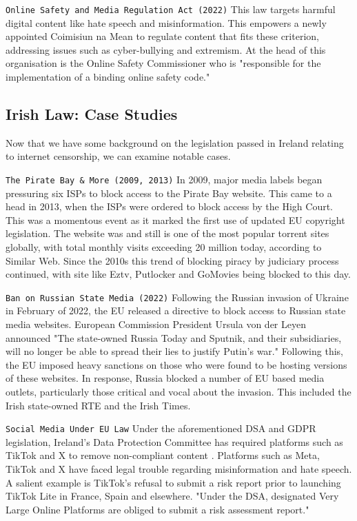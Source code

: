 \texttt{Online Safety and Media Regulation Act (2022)}
This law targets harmful digital content like hate speech and misinformation. This empowers a newly appointed Coimisiun na Mean to regulate content that fits these criterion, addressing issues such as cyber-bullying and extremism. At the head of this organisation is the Online Safety Commissioner who is "responsible for the implementation of a binding online safety code." \cite{onlinesafety2022}

\subsection{Irish Law: Case Studies}
Now that we have some background on the legislation passed in Ireland relating to internet censorship, we can examine notable cases. 

\texttt{The Pirate Bay \& More (2009, 2013)}
In 2009, major media labels began pressuring six ISPs to block access to the Pirate Bay website. This came to a head in 2013, when the ISPs were ordered to block access by the High Court. \cite{piratebay_block2013} This was a momentous event as it marked the first use of updated EU copyright legislation. The website was and still is one of the most popular torrent sites globally, with total monthly visits exceeding 20 million today, according to Similar Web. \cite{piratebay_stats2025} Since the 2010s this trend of blocking piracy by judiciary process continued, with site like Eztv, Putlocker and GoMovies being blocked to this day.

\texttt{Ban on Russian State Media (2022)}
Following the Russian invasion of Ukraine in February of 2022, the EU released a directive \cite{eu_sanctions_russia_media} to block access to Russian state media websites. European Commission President Ursula von der Leyen announced "The state-owned Russia Today and Sputnik, and their subsidiaries, will no longer be able to spread their lies to justify Putin’s war." \cite{rt_ban2022} Following this, the EU imposed heavy sanctions on those who were found to be hosting versions of these websites. In response, Russia blocked a number of EU based media outlets, particularly those critical and vocal about the invasion. This included the Irish state-owned RTE and the Irish Times. \cite{euronews_russia_media_block2024}

\texttt{Social Media Under EU Law}
Under the aforementioned DSA and GDPR legislation, Ireland's Data Protection Committee has required platforms such as TikTok \cite{dpc2023tiktok} and X \cite{irishtimes2024x} to remove non-compliant content \cite{iapp2023tiktok}. Platforms such as Meta, TikTok and X have faced legal trouble regarding misinformation and hate speech. A salient example is TikTok's refusal to submit a risk report prior to launching TikTok Lite in France, Spain and elsewhere. "Under the DSA, designated Very Large Online Platforms are obliged to submit a risk assessment report." \cite{ec_press_release_2024} 


